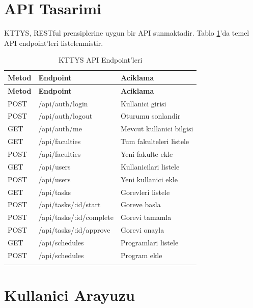 \section{API Tasarimi}
\label{sec:api-tasarimi}

KTTYS, RESTful prensiplerine uygun bir API sunmaktadir. Tablo 
\ref{tab:api-endpoints}'da temel API endpoint'leri listelenmistir.

\begin{longtable}{|p{2cm}|p{4.5cm}|p{5cm}|}
\hline
\textbf{Metod} & \textbf{Endpoint} & \textbf{Aciklama} \\
\hline
\endfirsthead
\hline
\textbf{Metod} & \textbf{Endpoint} & \textbf{Aciklama} \\
\hline
\endhead
\hline
\endfoot

POST & /api/auth/login & Kullanici girisi \\
\hline
POST & /api/auth/logout & Oturumu sonlandir \\
\hline
GET & /api/auth/me & Mevcut kullanici bilgisi \\
\hline
GET & /api/faculties & Tum fakulteleri listele \\
\hline
POST & /api/faculties & Yeni fakulte ekle \\
\hline
GET & /api/users & Kullanicilari listele \\
\hline
POST & /api/users & Yeni kullanici ekle \\
\hline
GET & /api/tasks & Gorevleri listele \\
\hline
POST & /api/tasks/:id/start & Goreve basla \\
\hline
POST & /api/tasks/:id/complete & Gorevi tamamla \\
\hline
POST & /api/tasks/:id/approve & Gorevi onayla \\
\hline
GET & /api/schedules & Programlari listele \\
\hline
POST & /api/schedules & Program ekle \\
\hline

\caption{KTTYS API Endpoint'leri}
\label{tab:api-endpoints}
\end{longtable}

\section{Kullanici Arayuzu}
\label{sec:kullanici-arayuzu}


